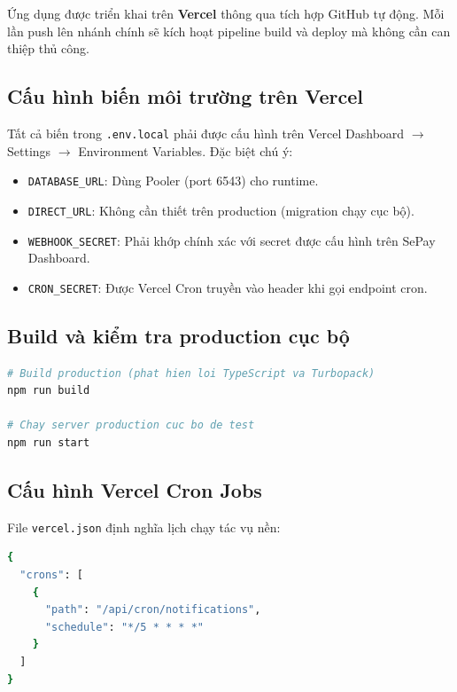 \documentclass[14pt,a4paper]{report}
\begin{document}
Ứng dụng được triển khai trên \textbf{Vercel} thông qua tích hợp
GitHub tự động. Mỗi lần push lên nhánh chính sẽ kích hoạt pipeline
build và deploy mà không cần can thiệp thủ công.

\subsection{Cấu hình biến môi trường trên Vercel}

Tất cả biến trong \texttt{.env.local} phải được cấu hình trên
Vercel Dashboard $\rightarrow$ Settings $\rightarrow$ Environment
Variables. Đặc biệt chú ý:

\begin{itemize}
    \item \texttt{DATABASE\_URL}: Dùng Pooler (port 6543) cho runtime.
    \item \texttt{DIRECT\_URL}: Không cần thiết trên production
          (migration chạy cục bộ).
    \item \texttt{WEBHOOK\_SECRET}: Phải khớp chính xác với secret
          được cấu hình trên SePay Dashboard.
    \item \texttt{CRON\_SECRET}: Được Vercel Cron truyền vào header
          khi gọi endpoint cron.
\end{itemize}

\subsection{Build và kiểm tra production cục bộ}

\begin{lstlisting}[language=bash, caption={Kiểm tra build trước khi deploy}]
# Build production (phat hien loi TypeScript va Turbopack)
npm run build

# Chay server production cuc bo de test
npm run start
\end{lstlisting}

\subsection{Cấu hình Vercel Cron Jobs}

File \texttt{vercel.json} định nghĩa lịch chạy tác vụ nền:

\begin{lstlisting}[language=bash, caption={vercel.json -- Cấu hình Vercel Cron}]
{
  "crons": [
    {
      "path": "/api/cron/notifications",
      "schedule": "*/5 * * * *"
    }
  ]
}
\end{lstlisting}
\end{document}
